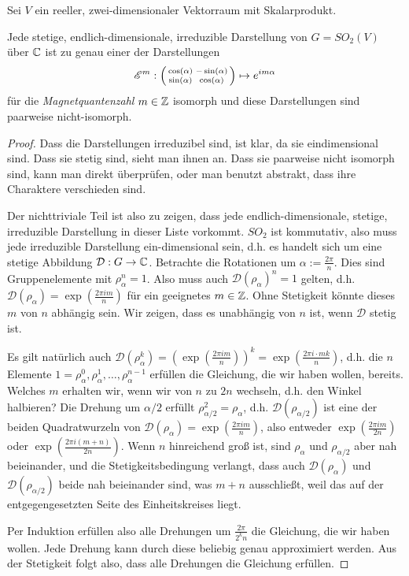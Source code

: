 \begin{theoremdef}[Darstellungstheorie von $SO_2$ über $\IK=\IC$]
Sei $V$ ein reeller, zwei-dimensionaler Vektorraum mit Skalarprodukt.

Jede stetige, endlich-dimensionale, irreduzible Darstellung von $G=SO_2(V)$ über $\mathbb{C}$ ist zu genau einer der Darstellungen
\[\mathscr{E}^m : \begin{psmallmatrix}\cos(\alpha)&-\sin(\alpha)\\\sin(\alpha)&\cos(\alpha)\end{psmallmatrix} \mapsto e^{im\alpha}\]
für die \emph{Magnetquantenzahl} $m\in\mathbb{Z}$ isomorph und diese Darstellungen sind paarweise nicht-isomorph.
\end{theoremdef}
\begin{proof}
Dass die Darstellungen irreduzibel sind, ist klar, da sie eindimensional sind. Dass sie stetig sind, sieht man ihnen an. Dass sie paarweise nicht isomorph sind, kann man direkt überprüfen, oder man benutzt abstrakt, dass ihre Charaktere verschieden sind.

Der nichttriviale Teil ist also zu zeigen, dass jede endlich-dimensionale, stetige, irreduzible Darstellung in dieser Liste vorkommt. $SO_2$ ist kommutativ, also muss jede irreduzible Darstellung ein-dimensional sein, d.h. es handelt sich um eine stetige Abbildung $\mathcal{D}: G\to\mathbb{C}$. Betrachte die Rotationen um $\alpha:=\frac{2\pi}{n}$. Dies sind Gruppenelemente mit $\rho_\alpha^n=1$. Also muss auch $\mathcal{D}(\rho_\alpha)^n=1$ gelten, d.h. $\mathcal{D}(\rho_\alpha) = \exp(\frac{2\pi i m}{n})$ für ein geeignetes $m\in\mathbb{Z}$. Ohne Stetigkeit könnte dieses $m$ von $n$ abhängig sein. Wir zeigen, dass es unabhängig von $n$ ist, wenn $\mathcal{D}$ stetig ist.

Es gilt natürlich auch $\mathcal{D}(\rho_\alpha^k) = (\exp(\frac{2\pi i m}{n}))^k = \exp(\frac{2\pi i\cdot  mk}{n})$, d.h. die $n$ Elemente $1=\rho_\alpha^0, \rho_\alpha^1, \ldots, \rho_\alpha^{n-1}$ erfüllen die Gleichung, die wir haben wollen, bereits. Welches $m$ erhalten wir, wenn wir von $n$ zu $2n$ wechseln, d.h. den Winkel halbieren? Die Drehung um $\alpha/2$ erfüllt $\rho_{\alpha/2}^2=\rho_\alpha$, d.h. $\mathcal{D}(\rho_{\alpha/2})$ ist eine der beiden Quadratwurzeln von $\mathcal{D}(\rho_\alpha)=\exp(\frac{2\pi i m}{n})$, also entweder $\exp(\frac{2\pi i m}{2n})$ oder $\exp(\frac{2\pi i(m+n)}{2n})$. Wenn $n$ hinreichend groß ist, sind $\rho_\alpha$ und $\rho_{\alpha/2}$ aber nah beieinander, und die Stetigkeitsbedingung verlangt, dass auch $\mathcal{D}(\rho_\alpha)$ und $\mathcal{D}(\rho_{\alpha/2})$ beide nah beieinander sind, was $m+n$ ausschließt, weil das auf der entgegengesetzten Seite des Einheitskreises liegt.

Per Induktion erfüllen also alle Drehungen um $\frac{2\pi}{2^k n}$ die Gleichung, die wir haben wollen. Jede Drehung kann durch diese beliebig genau approximiert werden. Aus der Stetigkeit folgt also, dass alle Drehungen die Gleichung erfüllen.
\end{proof}

